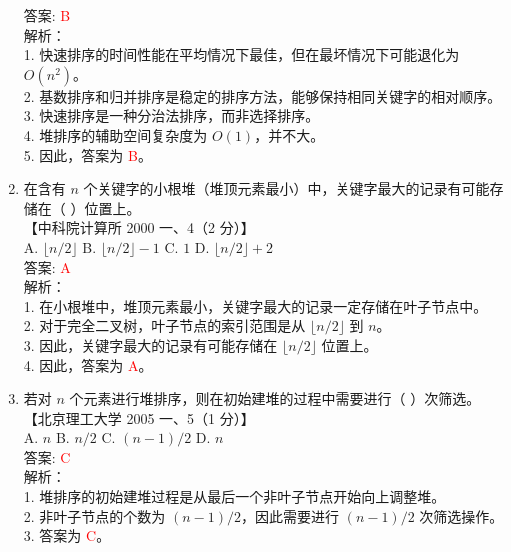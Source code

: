 \documentclass[lang=cn,newtx,10pt,scheme=chinese]{../../../elegantbook}
\begin{document}
\begin{enumerate}
    答案: \textcolor{red}{B} \\

    解析：\\
    1. 快速排序的时间性能在平均情况下最佳，但在最坏情况下可能退化为 $O(n^2)$。\\
    2. 基数排序和归并排序是稳定的排序方法，能够保持相同关键字的相对顺序。\\
    3. 快速排序是一种分治法排序，而非选择排序。\\
    4. 堆排序的辅助空间复杂度为 $O(1)$，并不大。\\
    5. 因此，答案为 \textcolor{red}{B}。\\

    \item 在含有 $n$ 个关键字的小根堆（堆顶元素最小）中，关键字最大的记录有可能存储在（ ）位置上。\\
    【中科院计算所 2000 一、4（2 分）】\\  

    A. $\lfloor n/2 \rfloor$ \quad B. $\lfloor n/2 \rfloor - 1$ \quad C. $1$ \quad D. $\lfloor n/2 \rfloor + 2$ \\  

    答案: \textcolor{red}{A} \\

    解析：\\
    1. 在小根堆中，堆顶元素最小，关键字最大的记录一定存储在叶子节点中。\\
    2. 对于完全二叉树，叶子节点的索引范围是从 $\lfloor n/2 \rfloor$ 到 $n$。\\
    3. 因此，关键字最大的记录有可能存储在 $\lfloor n/2 \rfloor$ 位置上。\\
    4. 因此，答案为 \textcolor{red}{A}。\\

\item 若对 $n$ 个元素进行堆排序，则在初始建堆的过程中需要进行（ ）次筛选。\\
    【北京理工大学 2005 一、5（1 分）】\\  

    A. $n$ \quad B. $n/2$ \quad C. $(n-1)/2$ \quad D. $n$ \\  

    答案: \textcolor{red}{C} \\

    解析：\\
    1. 堆排序的初始建堆过程是从最后一个非叶子节点开始向上调整堆。\\
    2. 非叶子节点的个数为 $(n-1)/2$，因此需要进行 $(n-1)/2$ 次筛选操作。\\
    3. 答案为 \textcolor{red}{C}。\\


\end{enumerate}
\end{document}
